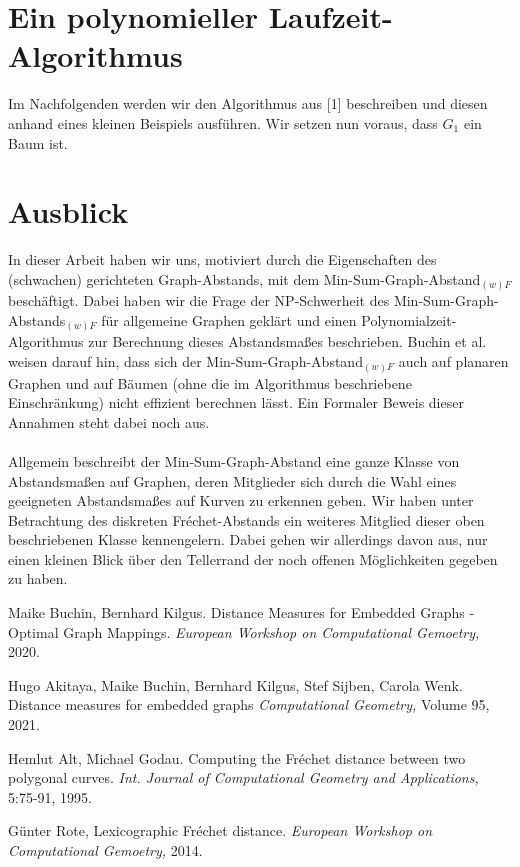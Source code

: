 \documentclass[a4paper, 12pt, twoside]{article}
\theoremstyle{Format1} %
\begin{document}
\section{Ein polynomieller Laufzeit-Algorithmus}

Im Nachfolgenden werden wir den Algorithmus aus [1] beschreiben und diesen anhand eines kleinen Beispiels ausführen.
Wir setzen nun voraus, dass $G_1$ ein Baum ist.
\\
\section{Ausblick}
In dieser Arbeit haben wir uns, motiviert durch die Eigenschaften des (schwachen) gerichteten Graph-Abstands, mit dem
Min-Sum-Graph-Abstand$_{(w)F}$ beschäftigt. Dabei haben wir die Frage der NP-Schwerheit des Min-Sum-Graph-Abstands$_{(w)F}$ für allgemeine
Graphen geklärt und einen Polynomialzeit-Algorithmus zur Berechnung dieses Abstandsmaßes beschrieben.
Buchin et al. weisen darauf hin, dass sich der Min-Sum-Graph-Abstand$_{(w)F}$ auch auf planaren Graphen und
auf Bäumen (ohne die im Algorithmus beschriebene Einschränkung) nicht effizient berechnen lässt.
Ein Formaler Beweis dieser Annahmen steht dabei noch aus.
\\
\\
Allgemein beschreibt der Min-Sum-Graph-Abstand eine ganze Klasse von Abstandsmaßen auf Graphen, deren Mitglieder sich durch die Wahl
eines geeigneten Abstandsmaßes auf Kurven zu erkennen geben.
Wir haben unter Betrachtung des diskreten Fréchet-Abstands ein weiteres Mitglied dieser oben beschriebenen Klasse kennengelern.
Dabei gehen wir allerdings davon aus, nur einen kleinen Blick über den Tellerrand der noch offenen Möglichkeiten gegeben zu haben.
\newpage\null\thispagestyle{empty}\newpage

\begin{thebibliography}{4}
		Maike Buchin, Bernhard Kilgus. Distance Measures for Embedded Graphs - Optimal Graph Mappings.
		\textit{European Workshop on Computational Gemoetry,} 2020.

		Hugo Akitaya, Maike Buchin, Bernhard Kilgus, Stef Sijben, Carola Wenk. Distance measures for embedded graphs
		\textit{Computational Geometry,} Volume 95, 2021.

		Hemlut Alt, Michael Godau. Computing the Fréchet distance between two polygonal curves.
		\textit{Int. Journal of Computational Geometry and Applications,} 5:75-91, 1995.

		Günter Rote, Lexicographic Fréchet distance.
		\textit{European Workshop on Computational Gemoetry,} 2014.

\end{thebibliography}


\end{document}
